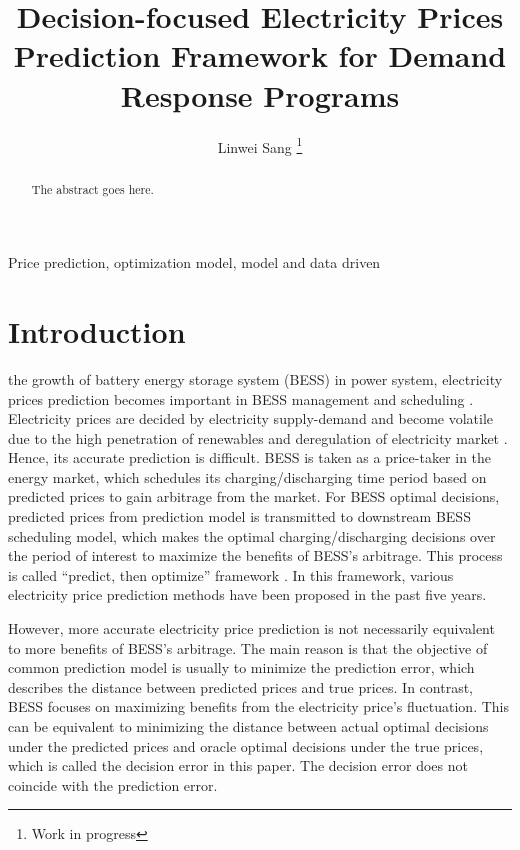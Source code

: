 \documentclass[journal]{IEEEtran}
\begin{document}
\title{Decision-focused Electricity Prices Prediction Framework for Demand Response Programs}

\author{Linwei Sang
\thanks{Work in progress}
}

\maketitle

\begin{abstract}
The abstract goes here.
\end{abstract}

\begin{IEEEkeywords}
Price prediction, optimization model, model and data driven
\end{IEEEkeywords}


\IEEEpeerreviewmaketitle


\section{Introduction}

 the growth of battery energy storage system (BESS) in power system, electricity prices prediction becomes important in BESS management and scheduling \cite{Chitsaz2018}. Electricity prices are decided by electricity supply-demand and become volatile due to the high penetration of renewables and deregulation of electricity market \cite{Peng2018}. Hence, its accurate prediction is difficult. BESS is taken as a price-taker in the energy market, which schedules its charging/discharging time period based on predicted prices to gain arbitrage from the market\cite{Arteaga2019}. For BESS optimal decisions, predicted prices from prediction model is transmitted to downstream BESS scheduling model, which makes the optimal charging/discharging decisions over the period of interest to maximize the benefits of BESS's arbitrage. This process is called ``predict, then optimize'' framework \cite{Elmachtoub2020}. In this framework, various electricity price prediction methods have been proposed in the past five years. 

However, more accurate electricity price prediction is not necessarily equivalent to more benefits of BESS's arbitrage. The main reason is that the objective of common prediction model is usually to minimize the prediction error, which describes the distance between predicted prices and true prices. In contrast, BESS focuses on maximizing benefits from the electricity price's fluctuation. This can be equivalent to minimizing the distance between actual optimal decisions under the predicted prices and oracle optimal decisions under the true prices, which is called the decision error in this paper. The decision error does not coincide with the prediction error. 
\end{document}
